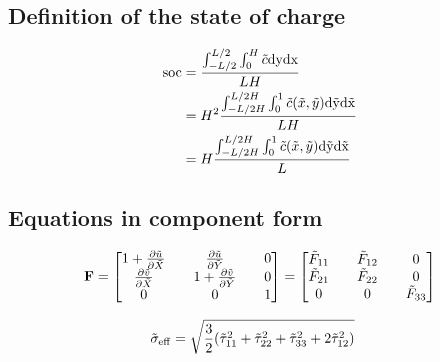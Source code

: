 \documentclass[../main.tex]{subfiles}
\begin{document}
\subsection{Definition of the state of charge}

\begin{align}
    \rm{soc} &= \frac{\int_{-L/2}^{L/2} \int_0^H \tilde{c} \rm{d}y \rm{d}x}{L H} \\
         &= H^2\frac{\int_{-L/2H}^{L/2H} \int_0^1 \tilde{c}(\tilde{x}, \tilde{y}) \rm{d}\tilde{y} \rm{d}\tilde{x}}{L H} \\
         &= H\frac{\int_{-L/2H}^{L/2H} \int_0^1 \tilde{c}(\tilde{x}, \tilde{y}) \rm{d}\tilde{y} \rm{d}\tilde{x}}{L} 
\end{align}

\subsection{Equations in component form}
\begin{align}
\mathbf{F} = 
\begin{bmatrix}
       1 + \frac{\partial \tilde{u}}{\partial \tilde{X}} && \frac{\partial \tilde{u}}{\partial \tilde{Y}} && 0 \\
       \frac{\partial \tilde{v}}{\partial \tilde{X}} && 1 + \frac{\partial \tilde{v}}{\partial \tilde{Y}} && 0 \\
       0 && 0 && 1
\end{bmatrix} = \begin{bmatrix}
    \tilde{F}_{11} && \tilde{F}_{12}  && 0 \\
    \tilde{F}_{21} && \tilde{F}_{22}  && 0 \\
    0 && 0 && \tilde{F}_{33}
\end{bmatrix}
\end{align}
















\begin{align}
    \tilde{\sigma}_{\rm{eff}} &= \sqrt{\frac{3}{2}(\tilde{\tau}_{11}^2 + \tilde{\tau}_{22}^2 + \tilde{\tau}_{33}^2 + 2\tilde{\tau}_{12}^2) }
\end{align}
\end{document}
